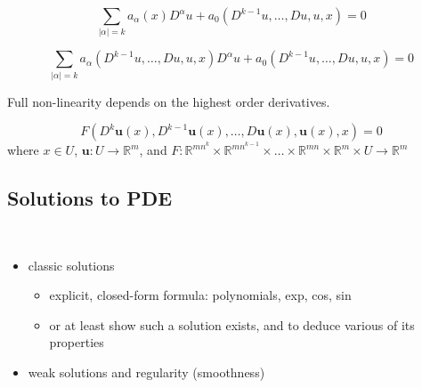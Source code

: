 \documentclass{blog}
\begin{document}
\begin{definition}
    \begin{equation}
        \label{eq:semi-linear}
        \sum_{|\alpha| = k} a_{\alpha}(x) D^{\alpha}u + a_{0} (D^{k-1}u, \dots, Du, u, x) = 0
    \end{equation}
\end{definition}

\begin{definition}
    \begin{equation}
        \label{eq:quasi-linear}
        \sum_{|\alpha| = k} a_{\alpha}(D^{k-1}u, \dots, Du, u, x) D^{\alpha}u + a_{0} (D^{k-1}u, \dots, Du, u, x) = 0
    \end{equation}
\end{definition}

Full non-linearity depends on the highest order derivatives.

\begin{definition}
    \begin{equation}
        \label{eq:pde-system}
        F(D^{k}\boldsymbol{u}(x), D^{k-1}\boldsymbol{u}(x), \dots, D\boldsymbol{u}(x), \boldsymbol{u}(x), x) = 0
    \end{equation}
    where $x \in U$, $\boldsymbol{u} : U \to \mathbb{R}^{m}$, and $F : \mathbb{R}^{mn^{k}} \times \mathbb{R}^{mn^{k-1}} \times \dots \times \mathbb{R}^{mn} \times \mathbb{R}^{m} \times U \to \mathbb{R}^{m}$
\end{definition}

\subsection{Solutions to PDE}
\begin{definition}~
    \begin{itemize}
        \item classic solutions
              \begin{itemize}
                  \item explicit, closed-form formula: polynomials, exp, cos, sin
                  \item or at least show such a solution exists, and to deduce various of its properties
              \end{itemize}
        \item weak solutions and regularity (smoothness)
    \end{itemize}
\end{definition}
\end{document}
